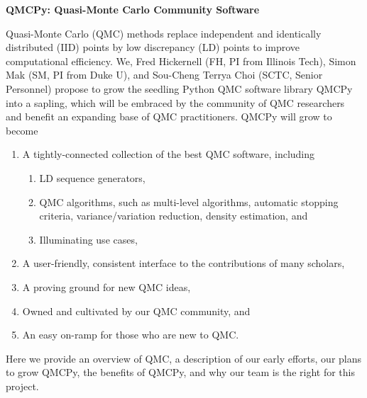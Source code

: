 \documentclass[11pt]{NSFamsart}
\begin{document}

\begin{center}
\Large \textbf{
QMCPy: Quasi-Monte Carlo Community Software\\ 
}
\end{center}
\vspace{-2ex}

\setcounter{tocdepth}{1}
\tableofcontents

\vspace{-6ex}


Quasi-Monte Carlo (QMC) methods replace independent and identically distributed (IID) points by low discrepancy (LD) points to improve computational efficiency.  We, Fred Hickernell (FH, PI from Illinois Tech), Simon Mak (SM, PI from Duke U), and Sou-Cheng Terrya Choi (SCTC, Senior Personnel) propose to grow the seedling Python QMC software library QMCPy \cite{QMCPy2020a} into a sapling, which will be embraced by the community of QMC researchers and benefit an expanding base of QMC practitioners.  QMCPy will grow to become
\begin{enumerate}
\renewcommand{\labelenumi}{\arabic{enumi}.}
    \item A tightly-connected collection of the best QMC software, including
    \begin{enumerate}
    \renewcommand{\labelenumii}{\alph{enumii}.}
        \item LD sequence generators,
        \item QMC algorithms, such as multi-level algorithms, automatic stopping criteria, variance/variation reduction, density estimation, and
        \item Illuminating use cases,
    \end{enumerate}
    \item A user-friendly, consistent interface to the contributions of many scholars,
    \item A proving ground for new QMC ideas,
    \item Owned and cultivated by our QMC community, and
    \item An easy on-ramp for those who are new to QMC.
\end{enumerate}

Here we provide an overview of QMC, a description of our early efforts, our plans to grow QMCPy, the benefits of QMCPy, and why our team is the right for this project.

\end{document}
